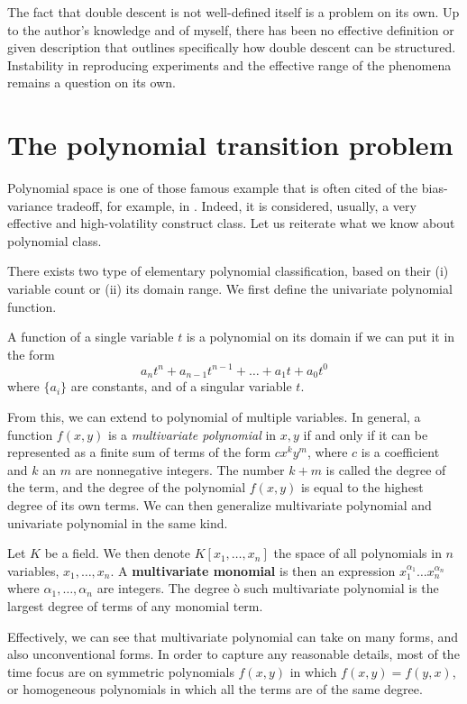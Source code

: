 \documentclass[
  journal=largetwo,
  year=2025,
  volume=37,
]{cup-journal}
\begin{document}
The fact that double descent is not well-defined itself is a problem on its own. Up to the author's knowledge and of myself, there has been no effective definition or given description that outlines specifically how double descent can be structured. Instability in reproducing experiments and the effective range of the phenomena remains a question on its own. 

\section{The polynomial transition problem}

Polynomial space is one of those famous example that is often cited of the bias-variance tradeoff, for example, in \cite{goodfellow2016deep,10.5555/2930837}. Indeed, it is considered, usually, a very effective and high-volatility construct class. Let us reiterate what we know about polynomial class. 

There exists two type of elementary polynomial classification, based on their (i) variable count or (ii) its domain range. We first define the univariate polynomial function.

\begin{definition}
    A function of a single variable $t$ is a polynomial on its domain if we can put it in the form 
    \begin{equation}
        a_{n}t^{n} + a_{n-1}t^{n-1} + \dots + a_{1}t + a_{0}t^{0}
    \end{equation}
    where $\{a_{i}\}$ are constants, and of a singular variable $t$.  
\end{definition}

From this, we can extend to polynomial of multiple variables. In general, a function $f(x,y)$ is a \textit{multivariate polynomial} in $x,y$ if and only if it can be represented as a finite sum of terms of the form $cx^{k}y^{m}$, where $c$ is a coefficient and $k$ an $m$ are nonnegative integers. The number $k+m$ is called the degree of the term, and the degree of the polynomial $f(x,y)$ is equal to the highest degree of its own terms. We can then generalize multivariate polynomial and univariate polynomial in the same kind. 

\begin{definition}
    Let $K$ be a field. We then denote $K[x_{1},\dots,x_{n}]$ the space of all polynomials in $n$ variables, $x_{1},\dots,x_{n}$. A \textbf{multivariate monomial} is then an expression $x_{1}^{\alpha_{1}}\dots x_{n}^{\alpha_{n}}$ where $\alpha_{1},\dots,\alpha_{n}$ are integers. The degree ò such multivariate polynomial is the largest degree of terms of any monomial term.
\end{definition}
Effectively, we can see that multivariate polynomial can take on many forms, and also unconventional forms. In order to capture any reasonable details, most of the time focus are on symmetric polynomials $f(x,y)$ in which $f(x,y)=f(y,x)$, or homogeneous polynomials in which all the terms are of the same degree. 
\end{document}
